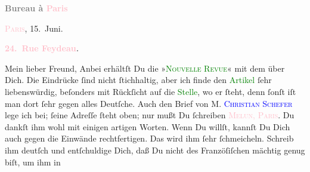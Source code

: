            \pstart
           \begin{otherlanguage}{french}\textcolor{gray}{\textbf{\textbf{Bureau à \textcolor{pink}{Paris}{}\ledrightnote{\textcolor{pink}{Paris}}}}}\end{otherlanguage}\hfill \textsc{\textcolor{pink}{Paris}{}\ledrightnote{\textcolor{pink}{Paris}}}, 15. Juni.\pend
           \pstart
           \begin{otherlanguage}{french}\textcolor{gray}{\textbf{\textbf{\textcolor{pink}{24. Rue Feydeau}{}\ledrightnote{\textcolor{pink}{rue Feydeau}}.}}}\end{otherlanguage}\pend
           \pstart{}Mein lieber Freund,\pend\pstart
           Anbei erhältſt Du die »\textsc{\textcolor{green}{Nouvelle Revue}{}\ledrightnote{\textcolor{green}{La Nouvelle Revue}}}« mit dem \label{K_L02777-1v}\label{K_L02777-1h} über Dich. Die Eindrücke ſind nicht ſtichhaltig, aber
               ich finde den \textcolor{green}{Artikel}{} ſehr
               liebenswürdig, beſonders mit Rückſicht auf die \textcolor{green}{Stelle}{}, wo er  ſteht,
               denn ſonſt iſt man dort ſehr gegen alles Deutſche. Auch den Brief von \textsc{M. \textcolor{blue}{Christian Schefer}{}\ledrightnote{\textcolor{blue}{Christian Schefer}}} lege ich bei; ſeine Adreſſe ſteht oben; nur mußt Du ſchreiben \textsc{\textcolor{pink}{Melun, \label{K_L02777-2v}\label{K_L02777-2h}
                     Paris}{}\ledrightnote{\textcolor{pink}{Melun}}}. Du dankſt ihm wohl mit einigen artigen Worten. {\pb}Wenn Du willſt, kannſt Du Dich auch gegen die
               Einwände rechtfertigen. Das wird ihm ſehr ſchmeicheln. Schreib ihm deutſch und
               entſchuldige Dich, daß Du nicht des Franzöſiſchen mächtig genug biſt, um ihm in
